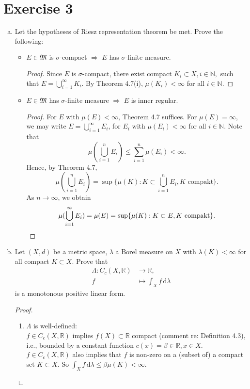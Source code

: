 \documentclass[10pt]{article}\usepackage[]{graphicx}\usepackage[]{color}
\newcommand{\N}{\mathbb{N}}
\newcommand{\R}{\mathbb{R}}
\newcommand{\df}{\,\textrm{d}}
\begin{document}

\section*{Exercise 3}
\begin{enumerate}[(a)]
  \item Let the hypotheses of Riesz representation theorem be met. Prove the following:
  \begin{itemize}
    \item $E \in \mathfrak{M}$ is $\sigma$-compact $\Rightarrow$ $E$ has $\sigma$-finite measure.
    \begin{proof}
     Since $E$ is $\sigma$-compact, there exist compact $K_i \subset X, i \in \N,$ such that 
     $E = \bigcup_{i = 1}^{\infty} K_i$.
     By Theorem 4.7(i), $\mu(K_i) < \infty$ for all $i \in \N$.
    \end{proof}
    
    \item $E \in \mathfrak{M}$ has $\sigma$-finite measure $\Rightarrow$ $E$ is inner regular.
    \begin{proof}
      For $E$ with $\mu(E) < \infty$, Theorem 4.7 suffices.
      For $\mu(E) = \infty$, we may write $E = \bigcup_{i = 1}^{\infty} E_i$,
      for $E_i$ with $\mu(E_i) < \infty$ for all $i \in \N$. Note that
      \[
        \mu(\bigcup_{i = 1}^n E_i) \leq \sum_{i = 1}^n \mu(E_i) < \infty.
      \]
      Hence, by Theorem 4.7,
      \[
        \mu(\bigcup_{i = 1}^n E_i) = \sup\{\mu(K) : K \subset \bigcup_{i = 1}^n E_i, \textrm{$K$ compakt}\}.
      \]
      As $n \to \infty$, we obtain
      \[
        \mu(\bigcup_{i = 1}^\infty E_i) = \mu(E) = \sup\{\mu(K) : K \subset E, \textrm{$K$ compakt}\}.\qedhere
      \]
    \end{proof}
  \end{itemize}
  
  \item Let $(X, d)$ be a metric space, $\lambda$ a Borel measure on $X$
  with $\lambda(K) < \infty$ for all compact $K \subset X$. Prove that
  \begin{align*}
    \Lambda: C_c(X, \R) &\to \R,\\
    f &\mapsto \int_X f \df \lambda
  \end{align*}
  is a monotonous positive linear form.
  \begin{proof}
  \begin{enumerate}[(1)]
    \item $\Lambda$ is well-defined:\\
    $f \in C_c(X, \R)$ implies $f(X) \subset \R$ compact (comment re: Definition 4.3), i.e., bounded
    by a constant function $c(x) = \beta \in \R, x \in X$.
    $f \in C_c(X, \R)$ also implies that $f$ is non-zero on a (subset of)
    a compact set $K \subset X$. So $\int_X f \df \lambda \leq \beta \mu(K) < \infty$.
    

\end{enumerate}
\end{proof}
\end{enumerate}
\end{document}
